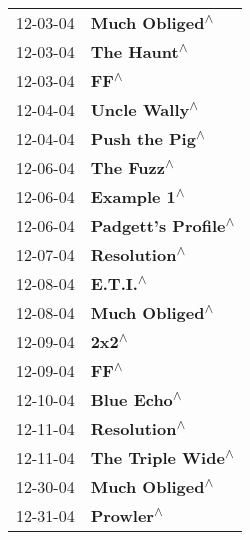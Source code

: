 \begin{supertabular}{p{0.25\columnwidth}p{0.75\columnwidth}}
 12-03-04 &                                                             \textbf{Much Obliged\textsuperscript{$\wedge$}} \\
 12-03-04 &                                                                \textbf{The Haunt\textsuperscript{$\wedge$}} \\
 12-03-04 &                                                                       \textbf{FF\textsuperscript{$\wedge$}} \\
 12-04-04 &                                                              \textbf{Uncle Wally\textsuperscript{$\wedge$}} \\
 12-04-04 &                                                             \textbf{Push the Pig\textsuperscript{$\wedge$}} \\
 12-06-04 &                                                                 \textbf{The Fuzz\textsuperscript{$\wedge$}} \\
 12-06-04 &                                                                \textbf{Example 1\textsuperscript{$\wedge$}} \\
 12-06-04 &                                                        \textbf{Padgett's Profile\textsuperscript{$\wedge$}} \\
 12-07-04 &                                                               \textbf{Resolution\textsuperscript{$\wedge$}} \\
 12-08-04 &                                                                   \textbf{E.T.I.\textsuperscript{$\wedge$}} \\
 12-08-04 &                                                             \textbf{Much Obliged\textsuperscript{$\wedge$}} \\
 12-09-04 &                                                                      \textbf{2x2\textsuperscript{$\wedge$}} \\
 12-09-04 &                                                                       \textbf{FF\textsuperscript{$\wedge$}} \\
 12-10-04 &                                                                \textbf{Blue Echo\textsuperscript{$\wedge$}} \\
 12-11-04 &                                                               \textbf{Resolution\textsuperscript{$\wedge$}} \\
 12-11-04 &                                                          \textbf{The Triple Wide\textsuperscript{$\wedge$}} \\
 12-30-04 &                                                             \textbf{Much Obliged\textsuperscript{$\wedge$}} \\
 12-31-04 &                                                                  \textbf{Prowler\textsuperscript{$\wedge$}} \\
\end{supertabular}
